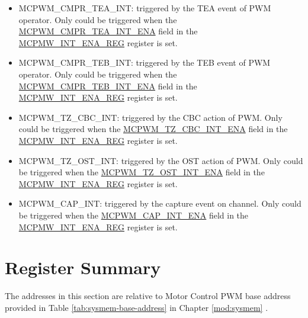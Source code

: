 \documentclass[main\_\_EN.tex]{subfiles}
\begin{document}
\begin{itemize}
\item \label{int:mcpwm-cmpr-tea}MCPWM\_CMPR\_TEA\_INT: triggered by the TEA event of PWM operator. Only could be triggered when the \hyperref[fielddesc:MCPWMCMPR0TEAINTENA]{MCPWM\_CMPR\_TEA\_INT\_ENA} field in the \hyperref[regdesc:MCPWMINTENAREG]{MCPMW\_INT\_ENA\_REG} register is set.
\item \label{int:mcpwm-cmpr-teb}MCPWM\_CMPR\_TEB\_INT: triggered by the TEB event of PWM operator. Only could be triggered when the \hyperref[fielddesc:MCPWMCMPR0TEBINTENA]{MCPWM\_CMPR\_TEB\_INT\_ENA} field in the \hyperref[regdesc:MCPWMINTENAREG]{MCPMW\_INT\_ENA\_REG} register is set.
\item \label{int:mcpwm-tz-cbc}MCPWM\_TZ\_CBC\_INT: triggered by the CBC action of PWM. Only could be triggered when the \hyperref[fielddesc:MCPWMTZ0CBCINTENA]{MCPWM\_TZ\_CBC\_INT\_ENA} field in the \hyperref[regdesc:MCPWMINTENAREG]{MCPMW\_INT\_ENA\_REG} register is set.
\item \label{int:mcpwm-tz-ost}MCPWM\_TZ\_OST\_INT: triggered by the OST action of PWM. Only could be triggered when the \hyperref[fielddesc:MCPWMTZ0OSTINTENA]{MCPWM\_TZ\_OST\_INT\_ENA} field in the \hyperref[regdesc:MCPWMINTENAREG]{MCPMW\_INT\_ENA\_REG} register is set.
\item \label{int:mcpwm-cap}MCPWM\_CAP\_INT: triggered by the capture event on channel. Only could be triggered when the \hyperref[fielddesc:MCPWMCAP0INTENA]{MCPWM\_CAP\_INT\_ENA} field in the  \hyperref[regdesc:MCPWMINTENAREG]{MCPMW\_INT\_ENA\_REG} register is set.
\end{itemize}





\clearpage
\hypertarget{mcpwm-reg-summ}{}
\section{Register Summary}
\label{sec:mcpwm-reg-summ}

The addresses in this section are relative to Motor Control PWM base address provided in Table \ref{tab:sysmem-base-address} in Chapter \ref{mod:sysmem} \textit{}.
\end{document}
